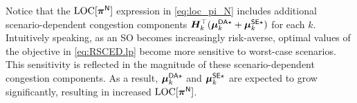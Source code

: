 Notice that the ${\rm LOC}[{\bm{\pi}}^{{\sf N}}]$ expression in \eqref{eq:loc_pi_N} includes additional scenario-dependent congestion components ${\bm{H}}_k^\top ({\bm{\mu}}_k^{{\sf DA}{}\star} + {\bm{\mu}}_k^{{\sf SE}{}\star})$ for each $k$. Intuitively speaking, as an SO becomes increasingly risk-averse, optimal values of the \RSCED{} objective in \eqref{eq:RSCED.lp} become more sensitive to worst-case scenarios. This sensitivity is reflected in the magnitude of these scenario-dependent congestion components. 
As a result, ${\bm{\mu}}_k^{{\sf DA}{}\star}$ and ${\bm{\mu}}_k^{{\sf SE}{}\star}$ are expected to grow significantly, resulting in increased ${\rm LOC}{}[{\bm{\pi}}^{{\sf N}}]$. 

